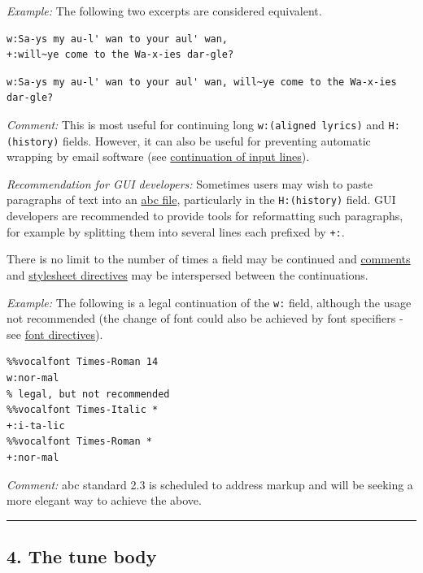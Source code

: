 \documentclass[oneside]{book}
\begin{document}
\emph{Example:} The following two excerpts are considered equivalent.

\begin{verbatim}
w:Sa-ys my au-l' wan to your aul' wan,
+:will~ye come to the Wa-x-ies dar-gle?
\end{verbatim}

\begin{verbatim}
w:Sa-ys my au-l' wan to your aul' wan, will~ye come to the Wa-x-ies dar-gle?
\end{verbatim}

\emph{Comment:} This is most useful for continuing long
\texttt{w:(aligned\ lyrics)} and \texttt{H:(history)} fields. However,
it can also be useful for preventing automatic wrapping by email
software (see
\protect\hyperlink{continuation_of_input_lines}{continuation of input
lines}).

\emph{Recommendation for GUI developers:} Sometimes users may wish to
paste paragraphs of text into an
\protect\hyperlink{abc_file_definition}{abc file}, particularly in the
\texttt{H:(history)} field. GUI developers are recommended to provide
tools for reformatting such paragraphs, for example by splitting them
into several lines each prefixed by \texttt{+:}.

There is no limit to the number of times a field may be continued and
\protect\hyperlink{comments_and_remarks}{comments} and
\protect\hyperlink{stylesheet_directive_definition}{stylesheet
directives} may be interspersed between the continuations.

\emph{Example:} The following is a legal continuation of the \texttt{w:}
field, although the usage not recommended (the change of font could also
be achieved by font specifiers - see
\protect\hyperlink{font_directives}{font directives}).

\begin{verbatim}
%%vocalfont Times-Roman 14
w:nor-mal
% legal, but not recommended
%%vocalfont Times-Italic *
+:i-ta-lic
%%vocalfont Times-Roman *
+:nor-mal
\end{verbatim}

\emph{Comment:} abc standard 2.3 is scheduled to address markup and will
be seeking a more elegant way to achieve the above.

\begin{center}\rule{0.5\linewidth}{\linethickness}\end{center}

\hypertarget{the_tune_body}{\subsection{4. The tune
body}\label{the_tune_body}}
\end{document}
